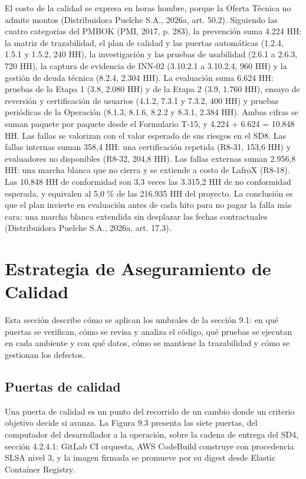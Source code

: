 El costo de la calidad se expresa en horas hombre, porque la Oferta Técnica no admite montos (Distribuidora Puelche S.A., 2026a, art. 50.2). Siguiendo las cuatro categorías del PMBOK (PMI, 2017, p. 283), la prevención suma 4.224 HH: la matriz de trazabilidad, el plan de calidad y las puertas automáticas (1.2.4, 1.5.1 y 1.5.2, 240 HH), la investigación y las pruebas de usabilidad (2.6.1 a 2.6.3, 720 HH), la captura de evidencia de INN-02 (3.10.2.1 a 3.10.2.4, 960 HH) y la gestión de deuda técnica (8.2.4, 2.304 HH). La evaluación suma 6.624 HH: pruebas de la Etapa 1 (3.8, 2.080 HH) y de la Etapa 2 (3.9, 1.760 HH), ensayo de reversión y certificación de usuarios (4.1.2, 7.3.1 y 7.3.2, 400 HH) y pruebas periódicas de la Operación (8.1.3, 8.1.6, 8.2.2 y 8.3.1, 2.384 HH). Ambas cifras se suman paquete por paquete desde el Formulario T-15, y 4.224 + 6.624 = 10.848 HH. Las fallas se valorizan con el valor esperado de sus riesgos en el SD8. Las fallas internas suman 358,4 HH: una certificación repetida (R8-31, 153,6 HH) y evaluadores no disponibles (R8-32, 204,8 HH). Las fallas externas suman 2.956,8 HH: una marcha blanca que no cierra y se extiende a costo de LafroX (R8-18). Las 10.848 HH de conformidad son 3,3 veces las 3.315,2 HH de no conformidad esperada, y equivalen al 5,0 \% de las 216.935 HH del proyecto. La conclusión es que el plan invierte en evaluación antes de cada hito para no pagar la falla más cara: una marcha blanca extendida sin desplazar las fechas contractuales (Distribuidora Puelche S.A., 2026a, art. 17.3).

\section{Estrategia de Aseguramiento de Calidad}

Esta sección describe cómo se aplican los umbrales de la sección 9.1: en qué puertas se verifican, cómo se revisa y analiza el código, qué pruebas se ejecutan en cada ambiente y con qué datos, cómo se mantiene la trazabilidad y cómo se gestionan los defectos.

\subsection{Puertas de calidad}

Una puerta de calidad es un punto del recorrido de un cambio donde un criterio objetivo decide si avanza. La Figura 9.3 presenta las siete puertas, del computador del desarrollador a la operación, sobre la cadena de entrega del SD4, sección 4.2.4.1: GitLab CI orquesta, AWS CodeBuild construye con procedencia SLSA nivel 3, y la imagen firmada se promueve por su digest desde Elastic Container Registry.

